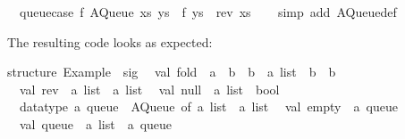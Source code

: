 \begin{isabellebody}
\ \ {}queue{}case\ f\ {}AQueue\ xs\ ys{}\ {}\ f\ {}ys\ {}\ rev\ xs{}{}\isanewline
\ \ \isamarkupfalse%
\ {}simp\ add{}\ AQueue{}def{}%
\endisatagquote
{\isafoldquote}%
%
\isadelimquote
%
\endisadelimquote
%
\begin{isamarkuptext}%
\noindent The resulting code looks as expected:%
\end{isamarkuptext}%
\isamarkuptrue%
%
\isadelimquotetypewriter
%
\endisadelimquotetypewriter
%
\isatagquotetypewriter
%
\begin{isamarkuptext}%
structure\ Example\ {}\ sig\isanewline
\ \ val\ fold\ {}\ {}{}a\ {}{}\ {}b\ {}{}\ {}b{}\ {}{}\ {}a\ list\ {}{}\ {}b\ {}{}\ {}b\isanewline
\ \ val\ rev\ {}\ {}a\ list\ {}{}\ {}a\ list\isanewline
\ \ val\ null\ {}\ {}a\ list\ {}{}\ bool\isanewline
\ \ datatype\ {}a\ queue\ {}\ AQueue\ of\ {}a\ list\ {}\ {}a\ list\isanewline
\ \ val\ empty\ {}\ {}a\ queue\isanewline
\ \ val\ queue\ {}\ {}a\ list\ {}{}\ {}a\ queue\isanewline

\end{isamarkuptext}
\end{isabellebody}
